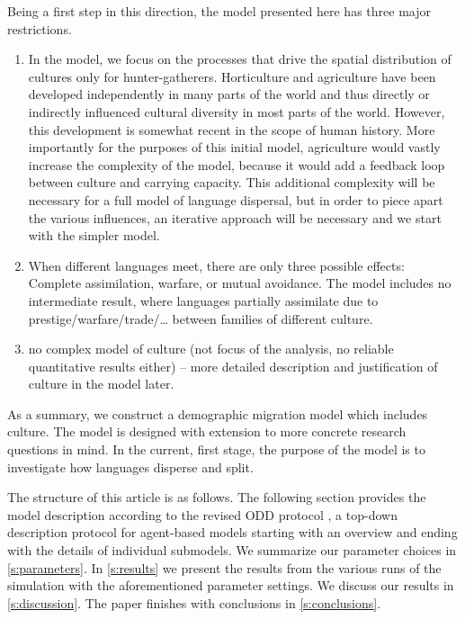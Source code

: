 \documentclass[a4paper,12pt]{scrartcl}
\begin{document}
Being a first step in this direction, the model presented here has three major restrictions.
\begin{enumerate}
\item In the model, we focus on the processes that drive the spatial
  distribution of cultures only for hunter-gatherers. Horticulture and
  agriculture have been developed independently in many parts of the world
  \parencite{} and thus directly or indirectly influenced cultural diversity in
  most parts of the world. However, this development is somewhat recent in the
  scope of human history. More importantly for the purposes of this initial
  model, agriculture would vastly increase the complexity of the model, because
  it would add a feedback loop between culture and carrying capacity. This
  additional complexity will be necessary for a full model of language
  dispersal, but in order to piece apart the various influences, an iterative
  approach will be necessary and we start with the simpler model.
\item When different languages meet, there are only three possible effects:
  Complete assimilation, warfare, or mutual avoidance. The model includes no
  intermediate result, where languages partially assimilate due to
  prestige/warfare/trade/… between families of different culture.
\item no complex model of culture (not focus of the analysis, no reliable
  quantitative results either) – more detailed description and justification of
  culture in the model later.
\end{enumerate}

As a summary, we construct a demographic migration model which includes culture.
The model is designed with extension to more concrete research questions in
mind. In the current, first stage, the purpose of the model is to investigate
how languages disperse and split.

The structure of this article is as follows. The following section provides the model
description according to the revised ODD protocol
\parencite{grimm2006standard,grimm2010odd}, a top-down description protocol for
agent-based models starting with an overview and ending with the details of
individual submodels. We summarize our parameter choices in \cref{s:parameters}.
In \cref{s:results} we present the results from the various runs of the
simulation with the aforementioned parameter settings. We discuss our results in
\cref{s:discussion}. The paper finishes with conclusions in
\cref{s:conclusions}.
\end{document}
